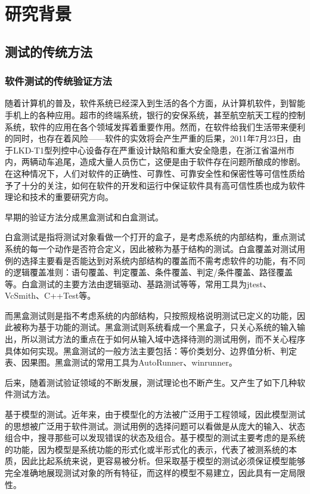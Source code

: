 ﻿\chapter{研究背景}
\section{测试的传统方法}
\subsection{软件测试的传统验证方法}
随着计算机的普及，软件系统已经深入到生活的各个方面，从计算机软件，到智能手机上的各种应用。超市的终端系统，银行的安保系统，甚至航空航天工程的控制系统，软件的应用在各个领域发挥着重要作用。然而，在软件给我们生活带来便利的同时，也存在着风险——软件的实效将会产生严重的后果，2011年7月23日，由于LKD-T1型列控中心设备存在严重设计缺陷和重大安全隐患，在浙江省温州市内，两辆动车追尾，造成大量人员伤亡，这便是由于软件存在问题所酿成的惨剧。在这种情况下，人们对软件的正确性、可靠性、可靠安全性和保密性等可信性质给予了十分的关注，如何在软件的开发和运行中保证软件具有高可信性质也成为软件理论和技术的重要研究方向。

早期的验证方法分成黑盒测试和白盒测试\cite{hetzel1991complete}。

白盒测试是指将测试对象看做一个打开的盒子，是考虑系统的内部结构，重点测试系统的每一个动作是否符合定义，因此被称为基于结构的测试。白盒覆盖对测试用例的选择主要看是否能达到对系统内部结构的覆盖而不需考虑软件的功能，有不同的逻辑覆盖准则：语句覆盖、判定覆盖、条件覆盖、判定/条件覆盖、路径覆盖等。白盒测试的主要方法由逻辑驱动、基路测试等等，常用工具为jtest、VcSmith、C++Test等。

而黑盒测试则是指不考虑系统的内部结构，只按照规格说明测试已定义的功能，因此被称为基于功能的测试。黑盒测试则系统看成一个黑盒子，只关心系统的输入输出，所以测试方法的重点在于如何从输入域中选择待测的测试用例，而不关心程序具体如何实现。黑盒测试的一般方法主要包括：等价类划分、边界值分析、判定表、因果图。黑盒测试的常用工具为AutoRunner、winrunner。


后来，随着测试验证领域的不断发展，测试理论也不断产生。又产生了如下几种软件测试方法。\cite{许静2003软件测试方法简述与展望}

基于模型的测试。近年来，由于模型化的方法被广泛用于工程领域，因此模型测试的思想被广泛用于软件测试。测试用例的选择问题可以看做是从庞大的输入、状态组合中，搜寻那些可以发现错误的状态及组合。基于模型的测试主要考虑的是系统的功能，因为模型是系统功能的形式化或半形式化的表示，代表了被测系统的本质，因此比起系统来说，更容易被分析。但采取基于模型的测试必须保证模型能够完全准确地展现测试对象的所有特征，而这样的模型不易建立，因此具有一定局限性。

